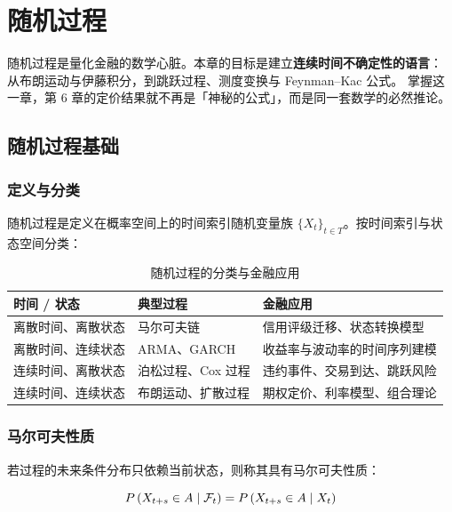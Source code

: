 \chapter{随机过程}

随机过程是量化金融的数学心脏。本章的目标是建立\textbf{连续时间不确定性的语言}：
从布朗运动与伊藤积分，到跳跃过程、测度变换与 Feynman--Kac 公式。
掌握这一章，第 6 章的定价结果就不再是「神秘的公式」，而是同一套数学的必然推论。

\section{随机过程基础}

\subsection{定义与分类}

随机过程是定义在概率空间上的时间索引随机变量族 $\{X_t\}_{t\in T}$。按时间索引与状态空间分类：

\begin{table}[htbp]
\centering
\caption{随机过程的分类与金融应用}\label{tab:10-class}
\tablefont
\begin{tabularx}{\textwidth}{@{}L{3.4cm}L{4.2cm}Y@{}}
\toprule
\textbf{时间 / 状态} & \textbf{典型过程} & \textbf{金融应用} \\
\midrule
离散时间、离散状态 & 马尔可夫链 & 信用评级迁移、状态转换模型 \\
离散时间、连续状态 & ARMA、GARCH & 收益率与波动率的时间序列建模 \\
连续时间、离散状态 & 泊松过程、Cox 过程 & 违约事件、交易到达、跳跃风险 \\
连续时间、连续状态 & 布朗运动、扩散过程 & 期权定价、利率模型、组合理论 \\
\bottomrule
\end{tabularx}
\end{table}

\subsection{马尔可夫性质}

若过程的未来条件分布只依赖当前状态，则称其具有马尔可夫性质：

\begin{equation}
  P\left(X_{t+s}\in A\mid\mathcal{F}_t\right) = P\left(X_{t+s}\in A\mid X_t\right)
  \label{eq:10-markov}
\end{equation}

